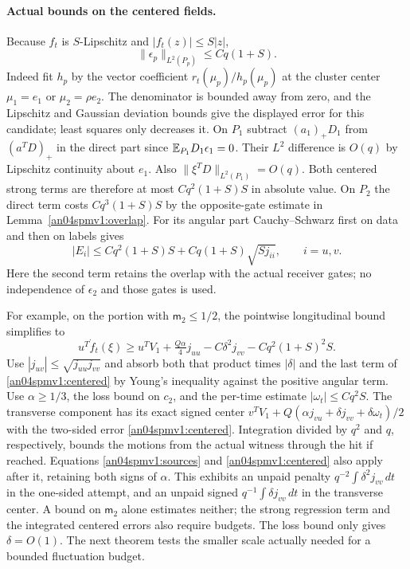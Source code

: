 \documentclass[11pt]{article}
\begin{document}
\paragraph{Actual bounds on the centered fields.}
Because $f_t$ is $S$-Lipschitz and $|f_t(z)|\le S|z|$,
\[
 \|\epsilon_p\|_{L^2(P_p)}\le C q(1+S).
\]
Indeed fit $h_p$ by the vector coefficient $r_t(\mu_p)/h_p(\mu_p)$
at the cluster center $\mu_1=e_1$ or $\mu_2=\rho e_2$.
The denominator is bounded away from zero, and the Lipschitz
and Gaussian deviation bounds give the displayed error for this
candidate; least squares only decreases it. On $P_1$ subtract
$(a_1)_+D_1$ from $(a^TD)_+$ in the direct part since
$\mathbb E_{P_1}D_1\epsilon_1=0$. Their $L^2$ difference is $O(q)$
by Lipschitz continuity about $e_1$. Also
$\|\xi^TD\|_{L^2(P_1)}=O(q)$. Both centered strong terms are
therefore at most $C q^2(1+S)S$ in absolute value. On $P_2$ the
direct term costs $Cq^3(1+S)S$ by the opposite-gate estimate in
Lemma~\ref{an04spmv1:overlap}. For its angular part Cauchy--Schwarz
first on data and then on labels gives
\begin{equation}\label{an04spmv1:centered}
 |E_i|\le C q^2(1+S)S+
             Cq(1+S)\sqrt{S j_{ii}},\qquad i=u,v .
\end{equation}
Here the second term retains the overlap with the actual receiver
gates; no independence of $\epsilon_2$ and those gates is used.

For example, on the portion with $\mathsf m_2\le1/2$, the pointwise
longitudinal bound simplifies to
\begin{equation}\label{an04spmv1:one}
 u^T\dot f_t(\xi)\ge
 u^TV_1+\tfrac{Q\alpha}{4}j_{uu}
             -C\delta^2 j_{vv}-C q^2(1+S)^2 S .
\end{equation}
Use $|j_{uv}|\le\sqrt{j_{uu}j_{vv}}$ and absorb both that product
times $|\delta|$ and the last term of \eqref{an04spmv1:centered}
by Young's inequality against the positive angular term. Use
$\alpha\ge1/3$, the loss bound on $c_2$, and the per-time estimate
$|\omega_t|\le C q^2 S$. The transverse component has its exact
signed center $v^TV_1+Q(\alpha j_{vu}+\delta j_{vv}+
\delta\omega_t)/2$ with the two-sided error
\eqref{an04spmv1:centered}. Integration divided by $q^2$ and $q$,
respectively, bounds the motions from the actual witness through
the hit if reached. Equations \eqref{an04spmv1:sources} and
\eqref{an04spmv1:centered} also apply after it, retaining both
signs of $\alpha$. This exhibits an unpaid penalty
$q^{-2}\int\delta^2 j_{vv}\,dt$ in the one-sided attempt, and an
unpaid signed $q^{-1}\int\delta j_{vv}\,dt$ in the transverse center.
A bound on $\mathsf m_2$ alone estimates neither; the strong
regression term and the integrated centered errors also require
budgets. The loss bound only gives $\delta=O(1)$. The next theorem tests the
smaller scale actually needed for a bounded fluctuation budget.
\end{document}
